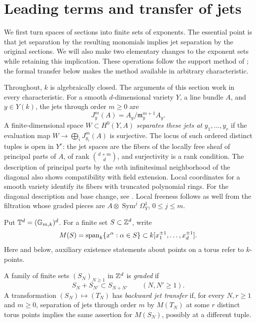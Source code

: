\section{Leading terms and transfer of jets}\label{sec:transfer}

We first turn spaces of sections into finite sets of exponents.  The
essential point is that jet separation by the resulting monomials implies
jet separation by the original sections.  We will also make two elementary
changes to the exponent sets while retaining this implication.
These operations follow the support method of
\cite[Section~2]{OpenAI2026Higher}; the formal transfer below makes the
method available in arbitrary characteristic.

Throughout, $k$ is algebraically closed.  The arguments of this section
work in every characteristic.  For a smooth $d$-dimensional variety $Y$,
a line bundle $A$, and $y\in Y(k)$, the jets through order $m\geq0$ are
\[
 J_y^m(A)=A_y/\mathfrak m_y^{m+1}A_y.
\]
A finite-dimensional space $W\subset H^0(Y,A)$ \emph{separates these
jets at} $y_1,\ldots,y_r$ if the evaluation map
$W\to\bigoplus_i J_{y_i}^m(A)$ is surjective.  The locus of such
ordered distinct tuples is open in $Y^r$: the jet spaces are the fibers
of the locally free sheaf of principal parts of $A$, of rank
$\binom{d+m}{d}$, and surjectivity is a rank condition.  The description
of principal parts by the $m$th infinitesimal neighborhood of the diagonal
also shows compatibility with field extension.  Local coordinates for a
smooth variety identify its fibers with truncated polynomial rings.
For the diagonal description and base change, see
\cite[Tags~0H90 and~0H8Z]{StacksProject}.  Local freeness follows as well
from the filtration whose graded pieces are
$A\otimes\operatorname{Sym}^j\Omega_Y^1$, $0\leq j\leq m$.

Put $\mathbb T^d=(\mathbb G_{m,k})^d$.  For a finite set $S\subset\mathbb Z^d$, write
\[
 M(S)=\operatorname{span}_k\{x^\alpha:\alpha\in S\}
 \subset k[x_1^{\pm1},\ldots,x_d^{\pm1}].
\]
Here and below, auxiliary existence statements about points on a torus
refer to $k$-points.

\begin{definition}\label{def:graded}
A family of finite sets $(S_N)_{N\geq1}$ in $\mathbb Z^d$ is \emph{graded} if
\[
 S_N+S_{N'}\subset S_{N+N'}\qquad(N,N'\geq1).
\]
A transformation $(S_N)\mapsto(T_N)$ has \emph{backward jet transfer}
if, for every $N,r\geq1$ and $m\geq0$, separation of jets through order
$m$ by $M(T_N)$ at some $r$ distinct torus points implies the same
assertion for $M(S_N)$, possibly at a different tuple.
\end{definition}

